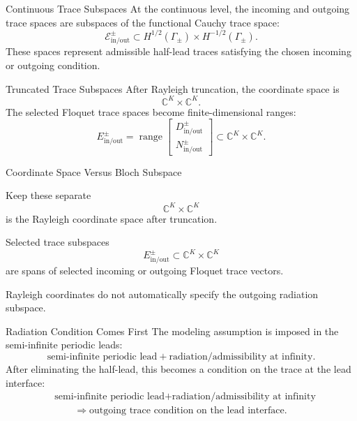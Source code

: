\documentclass[aspectratio=169]{beamer}
\begin{document}
\begin{frame}{Continuous Trace Subspaces}
  At the continuous level, the incoming and outgoing trace spaces are subspaces of the functional Cauchy trace space:
  \[
    \mathcal E_{\mathrm{in/out}}^\pm
    \subset
    H^{1/2}(\Gamma_\pm)\times H^{-1/2}(\Gamma_\pm).
  \]
  These spaces represent admissible half-lead traces satisfying the chosen incoming or outgoing condition.
\end{frame}

\begin{frame}{Truncated Trace Subspaces}
  After Rayleigh truncation, the coordinate space is
  \[
    \mathbb C^K\times\mathbb C^K.
  \]
  The selected Floquet trace spaces become finite-dimensional ranges:
  \[
    E_{\mathrm{in/out}}^\pm
    =
    \operatorname{range}
    \begin{bmatrix}
      D_{\mathrm{in/out}}^\pm\\
      N_{\mathrm{in/out}}^\pm
    \end{bmatrix}
    \subset
    \mathbb C^K\times\mathbb C^K.
  \]
\end{frame}

\begin{frame}{Coordinate Space Versus Bloch Subspace}
  \begin{block}{Keep these separate}
    \[
      \mathbb C^K\times\mathbb C^K
    \]
    is the Rayleigh coordinate space after truncation.
  \end{block}
  \begin{block}{Selected trace subspaces}
    \[
      E_{\mathrm{in/out}}^\pm
      \subset
      \mathbb C^K\times\mathbb C^K
    \]
    are spans of selected incoming or outgoing Floquet trace vectors.
  \end{block}
  Rayleigh coordinates do not automatically specify the outgoing radiation subspace.
\end{frame}

\begin{frame}{Radiation Condition Comes First}
  The modeling assumption is imposed in the semi-infinite periodic leads:
  \[
    \text{semi-infinite periodic lead}
    +
    \text{radiation/admissibility at infinity}.
  \]
  After eliminating the half-lead, this becomes a condition on the trace at the lead interface:
  \begin{align*}
    &\text{semi-infinite periodic lead}
    +
    \text{radiation/admissibility at infinity}\\
    &\qquad\Longrightarrow
    \text{outgoing trace condition on the lead interface}.
  \end{align*}
\end{frame}
\end{document}

